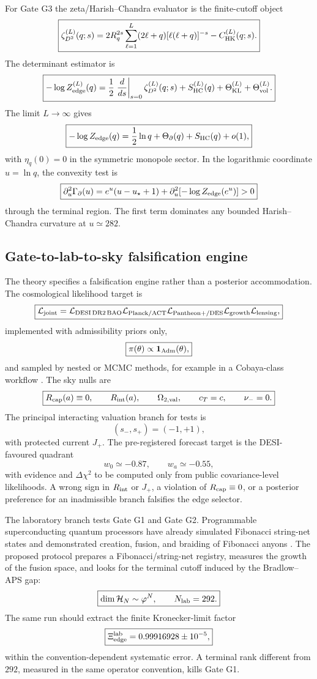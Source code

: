 \documentclass[aps,prd,reprint,nofootinbib,superscriptaddress,floatfix]{revtex4-2}
\numberwithin{equation}{section}
\theoremstyle{definition}
\theoremstyle{plain}
\begin{document}
For Gate G3 the zeta/Harish--Chandra evaluator is the finite-cutoff object
\[
\boxed{
\zeta_{D^2}^{(L)}(q;s)
=
2R_q^{2s}
\sum_{\ell=1}^{L}
(2\ell+q)[\ell(\ell+q)]^{-s}
-
C_{\rm HK}^{(L)}(q;s).
}
\]
The determinant estimator is
\[
\boxed{
-\log Z_{\rm edge}^{(L)}(q)
=
\frac12\left.\frac{d}{ds}\right|_{s=0}
\zeta_{D^2}^{(L)}(q;s)
+
S_{\rm HC}^{(L)}(q)
+
\Theta_{\rm KL}^{(L)}
+
\Theta_{\rm vol}^{(L)}.
}
\]
The limit \(L\to\infty\) gives
\[
\boxed{
-\log Z_{\rm edge}(q)
=
\frac12\ln q+\Theta_\partial(q)+S_{\rm HC}(q)+o(1),
}
\]
with \(\eta_q(0)=0\) in the symmetric monopole sector.  In the logarithmic
coordinate \(u=\ln q\), the convexity test is
\[
\boxed{
\partial_u^2\Gamma_\partial(u)
=
e^u(u-u_\star+1)
+
\partial_u^2[-\log Z_{\rm edge}(e^u)]>0
}
\]
through the terminal region.  The first term dominates any bounded
Harish--Chandra curvature at \(u\simeq282\).

\subsection{Gate-to-lab-to-sky falsification engine}

The theory specifies a falsification engine rather than a posterior
accommodation.  The cosmological likelihood target is
\[
\boxed{
\mathcal L_{\rm joint}
=
\mathcal L_{\rm DESI\,DR2\,BAO}
\mathcal L_{\rm Planck/ACT}
\mathcal L_{\rm Pantheon+/DES}
\mathcal L_{\rm growth}
\mathcal L_{\rm lensing},
}
\]
implemented with admissibility priors only,
\[
\boxed{
\pi(\theta)\propto\mathbf 1_{\rm Adm}(\theta),
}
\]
and sampled by nested or MCMC methods, for example in a Cobaya-class workflow
\cite{TorradoLewisCobaya2021}.  The sky nulls are
\[
\boxed{
R_{\rm cap}(a)\equiv0,\qquad
R_{\rm int}(a),\qquad
\Omega_{2,{\rm val}},\qquad
c_T=c,\qquad
\nu_-=0.
}
\]
The principal interacting valuation branch for tests is
\[
\boxed{
(s_-,s_+)=(-1,+1),
}
\]
with protected current \(J_+\).  The pre-registered forecast target is the
DESI-favoured quadrant
\[
\boxed{
w_0\simeq -0.87,\qquad w_a\simeq -0.55,
}
\]
with evidence and \(\Delta\chi^2\) to be computed only from public
covariance-level likelihoods.  A wrong sign in \(R_{\rm int}\) or \(J_+\), a
violation of \(R_{\rm cap}\equiv0\), or a posterior preference for an
inadmissible branch falsifies the edge selector.

The laboratory branch tests Gate G1 and Gate G2.  Programmable superconducting
quantum processors have already simulated Fibonacci string-net states and
demonstrated creation, fusion, and braiding of Fibonacci anyons
\cite{XuFibonacci2024,MinevFibonacci2025}.  The proposed protocol prepares a
Fibonacci/string-net registry, measures the growth of the fusion space,
and looks for the terminal cutoff induced by the Bradlow--APS gap:
\[
\boxed{
\dim\mathcal H_N\sim\varphi^N,
\qquad
N_{\rm lab}=292.
}
\]
The same run should extract the finite Kronecker-limit factor
\[
\boxed{
\Xi_{\rm edge}^{\rm lab}=0.99916928\pm10^{-5},
}
\]
within the convention-dependent systematic error.  A terminal rank different
from \(292\), measured in the same operator convention, kills Gate G1.
\end{document}
